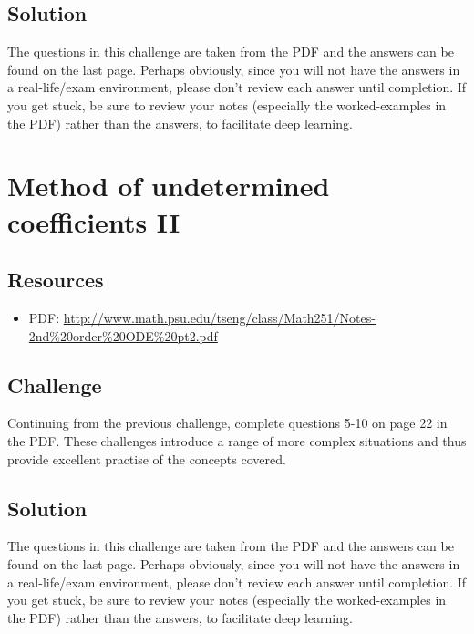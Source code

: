 \subsection*{Solution}
The questions in this challenge are taken from the PDF and the answers can be found on the last page. Perhaps obviously, since you will not have the answers in a real-life/exam environment, please don't review each answer until completion. If you get stuck, be sure to review your notes (especially the worked-examples in the PDF) rather than the answers, to facilitate deep learning. 

\timebox




\newpage
\section{Method of undetermined coefficients II}

\subsection*{Resources}
\begin{itemize}
    \item PDF: \url{http://www.math.psu.edu/tseng/class/Math251/Notes-2nd\%20order\%20ODE\%20pt2.pdf}
\end{itemize}

\subsection*{Challenge}
Continuing from the previous challenge, complete questions 5-10 on page 22 in the PDF. These challenges introduce a range of more complex situations and thus provide excellent practise of the concepts covered.

\subsection*{Solution}
The questions in this challenge are taken from the PDF and the answers can be found on the last page. Perhaps obviously, since you will not have the answers in a real-life/exam environment, please don't review each answer until completion. If you get stuck, be sure to review your notes (especially the worked-examples in the PDF) rather than the answers, to facilitate deep learning. 

\timebox




